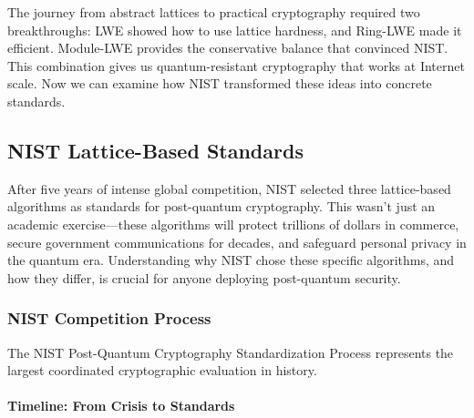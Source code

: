 \documentclass[11pt,a4paper]{article}
\begin{document}
The journey from abstract lattices to practical cryptography required two breakthroughs: LWE showed how to use lattice hardness, and Ring-LWE made it efficient. Module-LWE provides the conservative balance that convinced NIST. This combination gives us quantum-resistant cryptography that works at Internet scale. Now we can examine how NIST transformed these ideas into concrete standards.

\subsection{NIST Lattice-Based Standards}
\label{sec:nist-standards}

After five years of intense global competition, NIST selected three lattice-based algorithms as standards for post-quantum cryptography. This wasn't just an academic exercise—these algorithms will protect trillions of dollars in commerce, secure government communications for decades, and safeguard personal privacy in the quantum era. Understanding why NIST chose these specific algorithms, and how they differ, is crucial for anyone deploying post-quantum security.

\subsubsection{NIST Competition Process}

The NIST Post-Quantum Cryptography Standardization Process represents the largest coordinated cryptographic evaluation in history.

\paragraph{Timeline: From Crisis to Standards}
\end{document}
